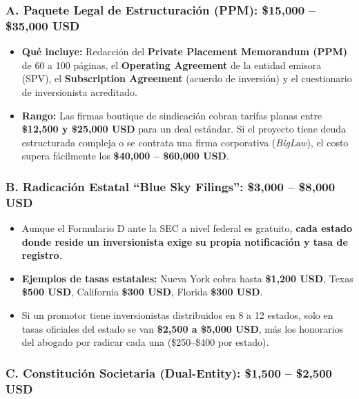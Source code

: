 \documentclass[
]{article}
\providecommand{\tightlist}{%
  \setlength{\itemsep}{0pt}\setlength{\parskip}{0pt}}
\begin{document}
\subsubsection{A. Paquete Legal de Estructuración (PPM): \$15,000 --
\$35,000
USD}\label{a.-paquete-legal-de-estructuraciuxf3n-ppm-15000-35000-usd}

\begin{itemize}
\tightlist
\item
  \textbf{Qué incluye:} Redacción del \textbf{Private Placement
  Memorandum (PPM)} de 60 a 100 páginas, el \textbf{Operating Agreement}
  de la entidad emisora (SPV), el \textbf{Subscription Agreement}
  (acuerdo de inversión) y el cuestionario de inversionista acreditado.
\item
  \textbf{Rango:} Las firmas boutique de sindicación cobran tarifas
  planas entre \textbf{\$12,500 y \$25,000 USD} para un deal estándar.
  Si el proyecto tiene deuda estructurada compleja o se contrata una
  firma corporativa (\emph{BigLaw}), el costo supera fácilmente los
  \textbf{\$40,000 -- \$60,000 USD}.
\end{itemize}

\subsubsection{B. Radicación Estatal ``Blue Sky Filings'': \$3,000 --
\$8,000
USD}\label{b.-radicaciuxf3n-estatal-blue-sky-filings-3000-8000-usd}

\begin{itemize}
\tightlist
\item
  Aunque el Formulario D ante la SEC a nivel federal es gratuito,
  \textbf{cada estado donde reside un inversionista exige su propia
  notificación y tasa de registro}.
\item
  \textbf{Ejemplos de tasas estatales:} Nueva York cobra hasta
  \textbf{\$1,200 USD}, Texas \textbf{\$500 USD}, California
  \textbf{\$300 USD}, Florida \textbf{\$300 USD}.
\item
  Si un promotor tiene inversionistas distribuidos en 8 a 12 estados,
  solo en tasas oficiales del estado se van \textbf{\$2,500 a \$5,000
  USD}, más los honorarios del abogado por radicar cada una
  (\$250--\$400 por estado).
\end{itemize}

\subsubsection{C. Constitución Societaria (Dual-Entity): \$1,500 --
\$2,500
USD}\label{c.-constituciuxf3n-societaria-dual-entity-1500-2500-usd}
\end{document}
